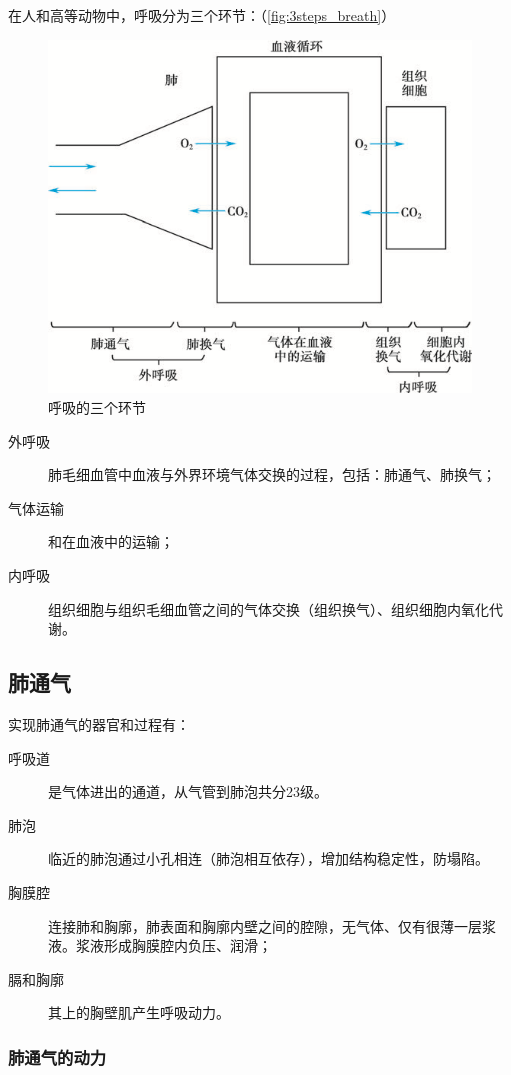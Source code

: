 在人和高等动物中，呼吸分为三个环节：（\autoref{fig:3steps_breath}）
\begin{figure}[htbp]
	\centering
	\includegraphics[width=0.7\linewidth]{Pics/呼吸的三个环节}
	\caption{呼吸的三个环节}
	\label{fig:3steps_breath}
\end{figure}

\begin{description}
	\item[外呼吸] 肺毛细血管中血液与外界环境气体交换的过程，包括：肺通气、肺换气；
	\item[气体运输] 和在血液中的运输；
	\item[内呼吸] 组织细胞与组织毛细血管之间的气体交换（组织换气）、组织细胞内氧化代谢。
\end{description}

\subsection{肺通气}

实现肺通气的器官和过程有：
\begin{description}
	\item[呼吸道] 是气体进出的通道，从气管到肺泡共分23级。
	\item[肺泡] 临近的肺泡通过小孔相连（肺泡相互依存），增加结构稳定性，防塌陷。
	\item[胸膜腔] 连接肺和胸廓，肺表面和胸廓内壁之间的腔隙，无气体、仅有很薄一层浆液。浆液形成胸膜腔内负压、润滑；
	\item[膈和胸廓] 其上的胸壁肌产生呼吸动力。
\end{description}

\subsubsection{肺通气的动力}

